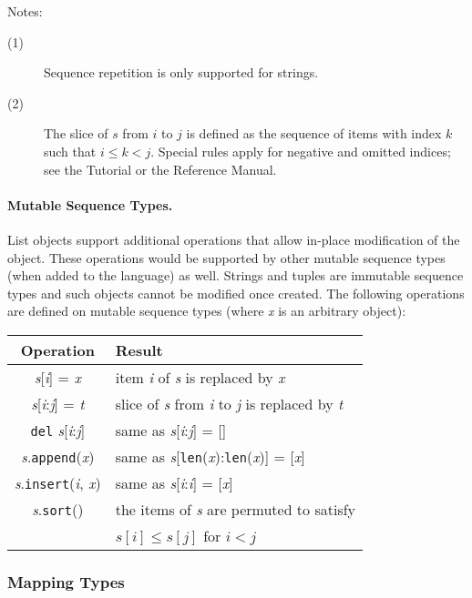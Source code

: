 \noindent
Notes:
\begin{description}
\item[(1)]
Sequence repetition is only supported for strings.
\item[(2)]
The slice of $s$ from $i$ to $j$ is defined as the sequence
of items with index $k$ such that $i \leq k < j$.
Special rules apply for negative and omitted indices; see the Tutorial
or the Reference Manual.
\end{description}

\paragraph{Mutable Sequence Types.}

List objects support additional operations that allow in-place
modification of the object.
These operations would be supported by other mutable sequence types
(when added to the language) as well.
Strings and tuples are immutable sequence types and such objects cannot
be modified once created.
The following operations are defined on mutable sequence types (where
{\em x} is an arbitrary object):

\begin{center}
\begin{tabular}{|c|l|}
\hline
Operation & Result \\
\hline
{\em s}[{\em i}] = {\em x} &
	item {\em i} of {\em s} is replaced by {\em x} \\
{\em s}[{\em i}:{\em j}] = {\em t} &
	slice of {\em s} from {\em i} to {\em j} is replaced by {\em t} \\
{\tt del} {\em s}[{\em i}:{\em j}] &
	same as {\em s}[{\em i}:{\em j}] = [] \\
{\em s}.{\tt append}({\em x}) &
	same as {\em s}[{\tt len}({\em x}):{\tt len}({\em x})] = [{\em x}] \\
{\em s}.{\tt insert}({\em i}, {\em x}) &
	same as {\em s}[{\em i}:{\em i}] = [{\em x}] \\
{\em s}.{\tt sort}() &
	the items of {\em s} are permuted to satisfy \\
	&
	$s[i] \leq s[j]$ for $i < j$\\
\hline
\end{tabular}
\end{center}

\subsubsection{Mapping Types}

